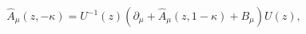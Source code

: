 \begin{equation}
\hat A_\mu(z,-\kappa)= U^{-1}(z)\left(
\partial_{\mu}+\hat A_\mu(z,1-\kappa)+B_\mu\right)U(z), 
\end{equation}

